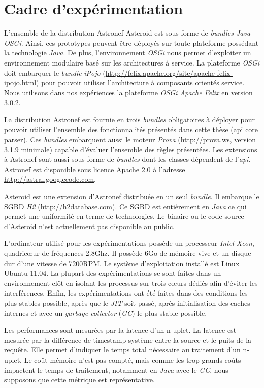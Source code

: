 \section{Cadre d'expérimentation}\label{sec:valid:perfs:cadre}
L'ensemble de la distribution Astronef-Asteroid est sous forme de \textit{bundles Java-OSGi}. Ainsi, ces prototypes peuvent être déployés sur toute plateforme possédant la technologie \textit{Java}. De plus, l'environnement \textit{OSGi} nous permet d'exploiter un environnement modulaire basé sur les architectures à service. La plateforme \textit{OSGi} doit embarquer le \textit{bundle} \textit{iPojo} (\url{http://felix.apache.org/site/apache-felix-ipojo.html}) pour pouvoir utiliser l'architecture à composants orientés service. Nous utilisons dans nos expériences la plateforme \textit{OSGi} \textit{Apache Felix} en version 3.0.2.

La distribution Astronef est fournie en trois \textit{bundles} obligatoires à déployer pour pouvoir utiliser l'ensemble des fonctionnalités présentés dans cette thèse (api core parser). Ces \textit{bundles} embarquent aussi le moteur \textit{Prova} (\url{http://prova.ws}, version 3.1.9 minimale) capable d'évaluer l'ensemble des règles présentées. Les extensions à Astronef sont aussi sous forme de \textit{bundles} dont les classes dépendent de l'\textit{api}. Astronef est disponible sous licence Apache 2.0 à l'adresse \url{http://astral.googlecode.com}.

Asteroid est une extension d'Astronef distribuée en un seul \textit{bundle}. Il embarque le SGBD \textit{H2} (\url{http://h2database.com}). Ce SGBD est entièrement en \textit{Java} ce qui permet une uniformité en terme de technologies. Le binaire ou le code source d'Asteroid n'est actuellement pas disponible au public.

L'ordinateur utilisé pour les expérimentations possède un processeur \textit{Intel Xeon}, quadricœur de fréquences 2.8Ghz. Il possède 6Go de mémoire vive et un disque dur d'une vitesse de 7200RPM. Le système d'exploitation installé est Linux Ubuntu 11.04. La plupart des expérimentations se sont faites dans un environnement clôt en isolant les processus sur trois cœurs dédiés afin d'éviter les interférences. Enfin, les expérimentations ont été faites dans des conditions les plus stables possible, après que le \textit{JIT} soit passé, après initialisation des caches internes et avec un \textit{garbage collector} (\textit{GC}) le plus stable possible.

Les performances sont mesurées par la latence d'un n-uplet. La latence est mesurée par la différence de timestamp système entre la source et le puits de la requête. Elle permet d'indiquer le temps total nécessaire au traitement d'un n-uplet. Le coût mémoire n'est pas compté, mais comme les trop grands coûts impactent le temps de traitement, notamment en \textit{Java} avec le \textit{GC}, nous supposons que cette métrique est représentative.